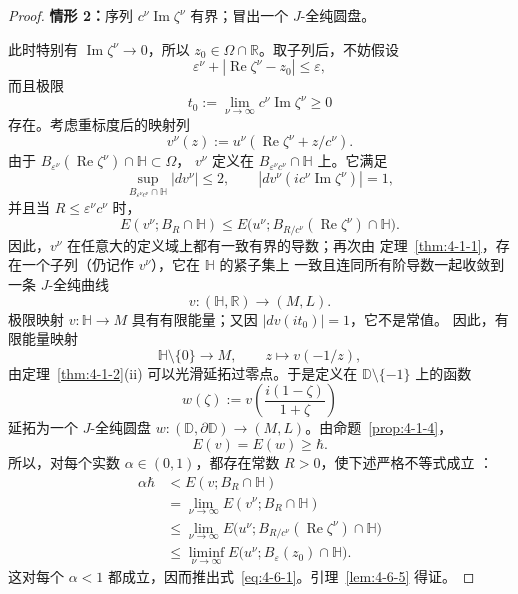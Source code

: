 \begin{proof}
\medskip
\noindent\textbf{情形 2：}序列 $c^\nu\operatorname{Im}\zeta^\nu$ 有界；冒出一个
$J$-全纯圆盘。

此时特别有 $\operatorname{Im}\zeta^\nu\to0$，所以
$z_0\in\Omega\cap\mathbb R$。取子列后，不妨假设
\[
  \varepsilon^\nu+|\operatorname{Re}\zeta^\nu-z_0|\le\varepsilon,
\]
而且极限
\[
  t_0:=\lim_{\nu\to\infty}c^\nu\operatorname{Im}\zeta^\nu\ge0
\]
存在。考虑重标度后的映射列
\[
  v^\nu(z):=u^\nu(\operatorname{Re}\zeta^\nu+z/c^\nu).
\]
由于
$B_{\varepsilon^\nu}(\operatorname{Re}\zeta^\nu)\cap\mathbb H\subset\Omega$，
$v^\nu$ 定义在 $B_{\varepsilon^\nu c^\nu}\cap\mathbb H$ 上。它满足
\[
  \sup_{B_{\varepsilon^\nu c^\nu}\cap\mathbb H}|dv^\nu|\le2,
  \qquad
  |dv^\nu(ic^\nu\operatorname{Im}\zeta^\nu)|=1,
\]
并且当 $R\le\varepsilon^\nu c^\nu$ 时，
\[
  E(v^\nu;B_R\cap\mathbb H)
  \le E\bigl(u^\nu;
    B_{R/c^\nu}(\operatorname{Re}\zeta^\nu)\cap\mathbb H\bigr).
\]
因此，$v^\nu$ 在任意大的定义域上都有一致有界的导数；再次由
定理~\ref{thm:4-1-1}，存在一个子列（仍记作 $v^\nu$），它在 $\mathbb H$ 的紧子集上
一致且连同所有阶导数一起收敛到一条 $J$-全纯曲线
\[
  v:(\mathbb H,\mathbb R)\longrightarrow(M,L).
\]
极限映射 $v:\mathbb H\to M$ 具有有限能量；又因 $|dv(it_0)|=1$，它不是常值。
因此，有限能量映射
\[
  \mathbb H\setminus\{0\}\longrightarrow M,
  \qquad z\longmapsto v(-1/z),
\]
由定理~\ref{thm:4-1-2}(ii) 可以光滑延拓过零点。于是定义在
$\mathbb D\setminus\{-1\}$ 上的函数
\[
  w(\zeta):=v\left(\frac{i(1-\zeta)}{1+\zeta}\right)
\]
延拓为一个 $J$-全纯圆盘
$w:(\mathbb D,\partial\mathbb D)\to(M,L)$。由命题~\ref{prop:4-1-4}，
\[
  E(v)=E(w)\ge\hbar.
\]
所以，对每个实数 $\alpha\in(0,1)$，都存在常数 $R>0$，使下述严格不等式成立
：
\[
  \begin{aligned}
  \alpha\hbar
  &<E(v;B_R\cap\mathbb H)\\
  &=\lim_{\nu\to\infty}E(v^\nu;B_R\cap\mathbb H)\\
  &\le\lim_{\nu\to\infty}
    E\bigl(u^\nu;B_{R/c^\nu}(\operatorname{Re}\zeta^\nu)
    \cap\mathbb H\bigr)\\
  &\le\liminf_{\nu\to\infty}
    E\bigl(u^\nu;B_\varepsilon(z_0)\cap\mathbb H\bigr).
  \end{aligned}
\]
这对每个 $\alpha<1$ 都成立，因而推出式~\eqref{eq:4-6-1}。引理~\ref{lem:4-6-5}
得证。
\end{proof}

